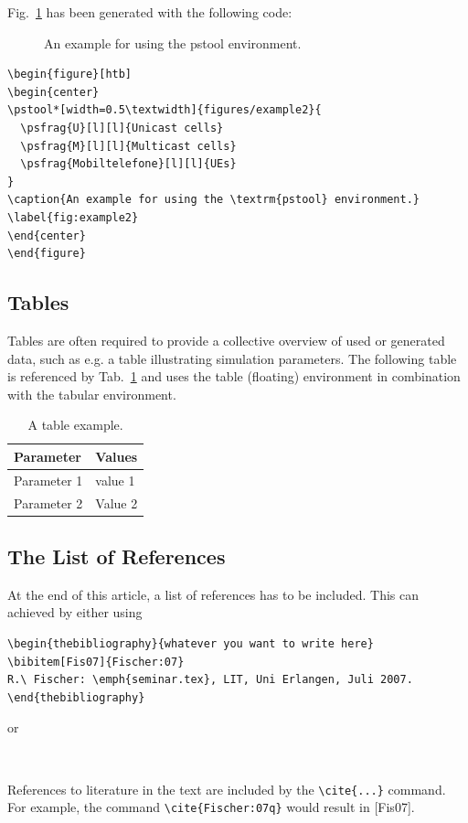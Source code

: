 \documentclass[12pt,a4paper,notitlepage,twoside,headsepline]{scrartcl}
\begin{document}
Fig.~\ref{fig:example2} has been generated with the following code:
\begin{figure}
    \begin{center}
    \caption{An example for using the \textrm{pstool} environment.}
    \label{fig:example2}
    \end{center}
\end{figure}
\begin{verbatim}
\begin{figure}[htb]
\begin{center}
\pstool*[width=0.5\textwidth]{figures/example2}{
  \psfrag{U}[l][l]{Unicast cells}
  \psfrag{M}[l][l]{Multicast cells}
  \psfrag{Mobiltelefone}[l][l]{UEs}
}
\caption{An example for using the \textrm{pstool} environment.}
\label{fig:example2}
\end{center}
\end{figure}
\end{verbatim}

\subsection{Tables}
Tables are often required to provide a collective overview of used or generated data, such as e.g. a table illustrating simulation parameters. The following table is referenced by Tab.~\ref{tab:Table_01} and uses the table (floating) environment in combination with the tabular environment.
\begin{table}[htb]
\caption{A table example.}\label{tab:Table_01}
\centering\begin{tabular}{ll} \toprule
	Parameter    & Values \\
	\midrule
	Parameter 1 & value 1 \\
	Parameter 2 & Value 2 \\ \bottomrule
\end{tabular}
\end{table}

\subsection{The List of References}
At the end of this article, a list of references has to be included. This can achieved by either using
\begin{verbatim}
\begin{thebibliography}{whatever you want to write here}
\bibitem[Fis07]{Fischer:07}
R.\ Fischer: \emph{seminar.tex}, LIT, Uni Erlangen, Juli 2007.
\end{thebibliography}
\end{verbatim}
or
\begin{verbatim}


\end{verbatim}
References to literature in the text are included by the \verb|\cite{...}| command. For example, the command
\verb|\cite{Fischer:07q}| would result in [Fis07].
\end{document}
